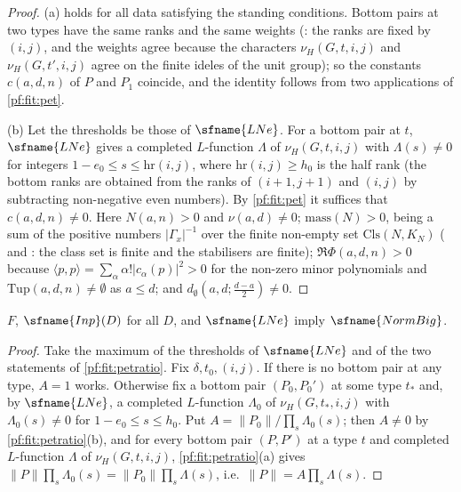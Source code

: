 \begin{proof}
(a) holds for all data satisfying the standing conditions. Bottom pairs at two types have the same ranks and the same weights
(: the ranks are fixed by $(i,j)$, and the weights agree because the
characters $\nu_H(G,t,i,j)$ and $\nu_H(G,t',i,j)$ agree on the finite ideles of the unit group); so the constants $c(a,d,n)$
of $P$ and $P_1$ coincide, and the identity follows from two applications of \cref{pf:fit:pet}.

(b) Let the thresholds be those of $\sfname{LNe}$. For a bottom pair at $t$, $\sfname{LNe}$ gives a completed $L$-function
$\Lambda$ of $\nu_H(G,t,i,j)$ with $\Lambda(s)\ne0$ for integers $1-e_0\le s\le\mathrm{hr}(i,j)$, where
$\mathrm{hr}(i,j)\ge h_0$ is the half rank (the bottom ranks are obtained from the ranks of $(i+1,j+1)$ and $(i,j)$ by subtracting
non-negative even numbers). By \cref{pf:fit:pet} it suffices that $c(a,d,n)\ne0$. Here $N(a,n)>0$ and $\nu(a,d)\ne0$;
$\mathrm{mass}(N)>0$, being a sum of the positive numbers $|\Gamma_x|^{-1}$ over the finite non-empty set $\mathrm{Cls}(N,K_N)$
( and : the class set is
finite and the stabilisers are finite); $\Re\Phi(a,d,n)>0$ because $\langle p,p\rangle=\sum_\alpha\alpha!|c_\alpha(p)|^2>0$ for
the non-zero minor polynomials and $\mathrm{Tup}(a,d,n)\ne\emptyset$ as $a\le d$; and $d_\emptyset(a,d;\tfrac{d-a}2)\ne0$.
\end{proof}

\begin{theorem}\label{pf:fit:normbig}
$F$, $\sfname{Inp}(D)$ for all $D$, and $\sfname{LNe}$ imply $\sfname{NormBig}$.
\end{theorem}

\begin{proof}
Take the maximum of the thresholds of $\sfname{LNe}$ and of the two statements of \cref{pf:fit:petratio}. Fix
$\delta,t_0,(i,j)$. If there is no bottom pair at any type, $A=1$ works. Otherwise fix a bottom pair $(P_0,P_0')$ at some type
$t_*$ and, by $\sfname{LNe}$, a completed $L$-function $\Lambda_0$ of $\nu_H(G,t_*,i,j)$ with $\Lambda_0(s)\ne0$ for
$1-e_0\le s\le h_0$. Put $A=\|P_0\|/\prod_s\Lambda_0(s)$; then $A\ne0$ by \cref{pf:fit:petratio}(b), and for every bottom pair
$(P,P')$ at a type $t$ and completed $L$-function $\Lambda$ of $\nu_H(G,t,i,j)$, \cref{pf:fit:petratio}(a) gives
$\|P\|\prod_s\Lambda_0(s)=\|P_0\|\prod_s\Lambda(s)$, i.e.\ $\|P\|=A\prod_s\Lambda(s)$.
\end{proof}

